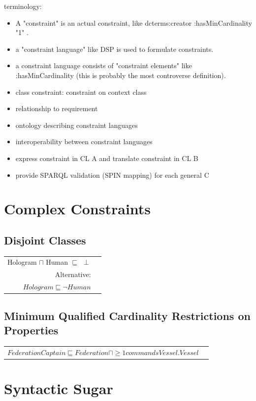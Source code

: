 \documentclass{llncs}
\newenvironment{DL}{
	\begin{center}
  \begin{tabular}{r l}

}{
  \end{tabular}
	\end{center}
}
\begin{document}
terminology:
\begin{itemize}
	\item A "constraint" is an actual constraint, like dcterms:creator :hasMinCardinality "1" .
  \item a "constraint language" like DSP is used to formulate constraints.
  \item a constraint language consists of "constraint elements" like :hasMinCardinality (this is probably the most controverse definition).
	\item class constraint: constraint on context class
\end{itemize}

\begin{itemize}
	\item relationship to requirement
  \item ontology describing constraint languages
	\item interoperability between constraint languages
  \item express constraint in CL A and translate constraint in CL B
  \item provide SPARQL validation (SPIN mapping) for each general C 
\end{itemize}

\section{Complex Constraints}

\subsection{Disjoint Classes}

\begin{DL}
Hologram $\sqcap$ Human $\sqsubseteq$ $\perp$\\
Alternative:\\
$Hologram \sqsubseteq \neg Human$
\end{DL}

\subsection{Minimum Qualified Cardinality Restrictions on Properties}

\begin{DL}
$FederationCaptain \sqsubseteq Federation \sqcap \geq1 commandsVessel . Vessel $
\end{DL}

\section{Syntactic Sugar}
\end{document}
